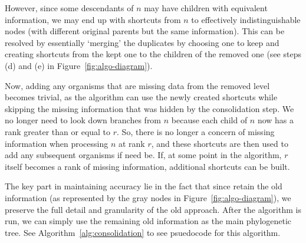 However, since some descendants of $n$ may have children with equivalent information, we may end up with shortcuts from $n$ to effectively indistinguishable nodes (with different original parents but the same information).
This can be resolved by essentially `merging' the duplicates by choosing one to keep and creating shortcuts from the kept one to the children of the removed one (see steps (d) and (e) in Figure~\ref{fig:algo-diagram}).

Now, adding any organisms that are missing data from the removed level becomes trivial, as the algorithm can use the newly created shortcuts while skipping the missing information that was hidden by the consolidation step.
We no longer need to look down branches from $n$ because each child of $n$ now has a rank greater than or equal to $r$. So, there is no longer a concern of missing information when processing $n$ at rank $r$, and these shortcuts are then used to add any subsequent organisms if need be.
If, at some point in the algorithm, $r$ itself becomes a rank of missing information, additional shortcuts can be built.



The key part in maintaining accuracy lie in the fact that since retain the old information (as represented by the gray nodes in Figure~\ref{fig:algo-diagram}), we preserve the full detail and granularity of the old approach. After the algorithm is run, we can simply use the remaining old information as the main phylogenetic tree. See Algorithm~\ref{alg:consolidation} to see psuedocode for this algorithm.